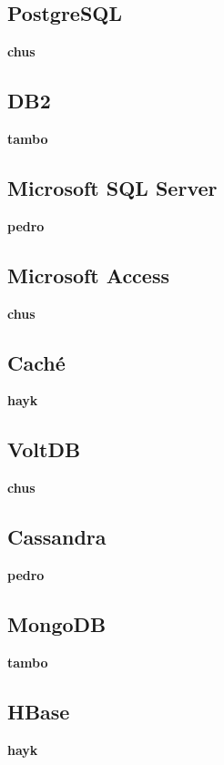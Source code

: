 \documentclass{article}
\begin{document}
\subsection{PostgreSQL}
\textbf{chus}
\subsection{DB2}
\textbf{tambo}
\subsection{Microsoft SQL Server}
\textbf{pedro}
\subsection{Microsoft Access}
\textbf{chus}
\subsection{Caché}
\textbf{hayk}
\subsection{VoltDB}
\textbf{chus}
\subsection{Cassandra}
\textbf{pedro}
\subsection{MongoDB}
\textbf{tambo}
\subsection{HBase}
\textbf{hayk}
\end{document}
